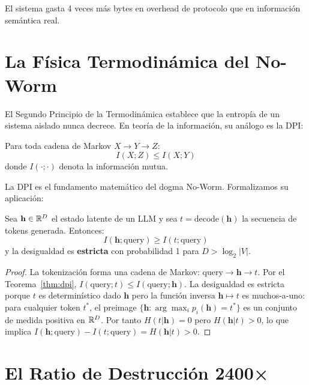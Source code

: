 El sistema gasta 4 veces más bytes en overhead de protocolo que en información
semántica real.

\section{La Física Termodinámica del No-Worm}

El Segundo Principio de la Termodinámica establece que la entropía de un sistema
aislado nunca decrece. En teoría de la información, su análogo es la DPI:

\begin{theorem}
\label{thm:dpi}
Para toda cadena de Markov $X \to Y \to Z$:
\begin{equation}
I(X; Z) \le I(X; Y)
\end{equation}
donde $I(\cdot;\cdot)$ denota la información mutua.
\end{theorem}

La DPI es el fundamento matemático del dogma No-Worm. Formalizamos su aplicación:

\begin{proposition}
\label{prop:no_worm}
Sea $\mathbf{h} \in \mathbb{R}^D$ el estado latente de un LLM y sea $t = \text{decode}(\mathbf{h})$
la secuencia de tokens generada. Entonces:
\begin{equation}
I(\mathbf{h}; \text{query}) \ge I(t; \text{query})
\end{equation}
y la desigualdad es \textbf{estricta} con probabilidad 1 para $D > \log_2|V|$.
\end{proposition}

\begin{proof}
La tokenización forma una cadena de Markov: $\text{query} \to \mathbf{h} \to t$.
Por el Teorema~\ref{thm:dpi}, $I(\text{query}; t) \le I(\text{query}; \mathbf{h})$.
La desigualdad es estricta porque $t$ es determinístico dado $\mathbf{h}$ pero la
función inversa $\mathbf{h} \mapsto t$ es muchos-a-uno: para cualquier token $t^*$,
el preimage $\{\mathbf{h} : \arg\max_i p_i(\mathbf{h}) = t^*\}$ es un conjunto de
medida positiva en $\mathbb{R}^D$. Por tanto $H(t | \mathbf{h}) = 0$ pero $H(\mathbf{h} | t) > 0$,
lo que implica $I(\mathbf{h}; \text{query}) - I(t; \text{query}) = H(\mathbf{h} | t) > 0$.
\end{proof}

\section{El Ratio de Destrucción 2400×}

